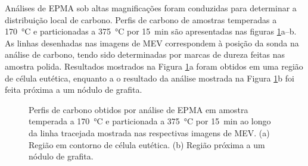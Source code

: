 Análises de EPMA sob altas magnificações foram conduzidas para determinar a distribuição local de carbono. Perfis de carbono de amostras temperadas a \SI{170}{\degreeCelsius} e particionadas a \SI{375}{\degreeCelsius} por 15~min são apresentadas nas figuras \ref{fig:EPMA_carbono}a--b. As linhas desenhadas nas imagens de MEV correspondem à posição da sonda na análise de carbono, tendo sido determinadas por marcas de dureza feitas nas amostra polida. Resultados mostrados na Figura \ref{fig:EPMA_carbono}a foram obtidos em uma região de célula eutética, enquanto a o resultado da análise mostrada na Figura \ref{fig:EPMA_carbono}b foi feita próxima a um nódulo de grafita.

\begin{figure}
  \centering
  \quad
  \caption{Perfis de carbono obtidos por análise de EPMA em amostra temperada a \SI{170}{\degreeCelsius} e particionada a \SI{375}{\degreeCelsius} por 15~min ao longo da linha tracejada mostrada nas respectivas imagens de MEV. (a) Região em contorno de célula eutética. (b) Região próxima a um nódulo de grafita.}
  \label{fig:EPMA_carbono}
\end{figure}

